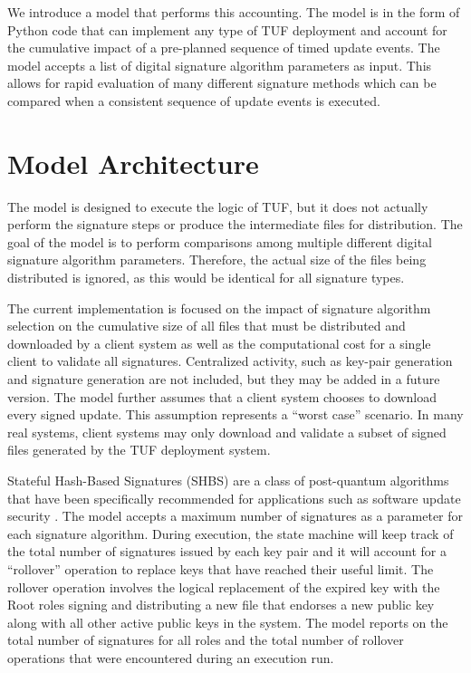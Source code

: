 \documentclass{article}
\begin{document}
We introduce a model that performs this accounting.  The model is in the form of Python code that can implement any type of TUF deployment and account for the cumulative impact of a pre-planned sequence of timed update events.  The model accepts a list of digital signature algorithm parameters as input.  This allows for rapid evaluation of many different signature methods which can be compared when a consistent sequence of update events is executed.  

\section{Model Architecture}
The model is designed to execute the logic of TUF, but it does not actually perform the signature steps or produce the intermediate files for distribution.  The goal of the model is to perform comparisons among multiple different digital signature algorithm parameters.  Therefore, the actual size of the files being distributed is ignored, as this would be identical for all signature types.

The current implementation is focused on the impact of signature algorithm selection on the cumulative size of all files that must be distributed and downloaded by a client system as well as the computational cost for a single client to validate all signatures.  Centralized activity, such as key-pair generation and signature generation are not included, but they may be added in a future version.  The model further assumes that a client system chooses to download every signed update.  This assumption represents a ``worst case'' scenario.  In many real systems, client systems may only download and validate a subset of signed files generated by the TUF deployment system.  

Stateful Hash-Based Signatures (SHBS) are a class of post-quantum algorithms that have been specifically recommended for applications such as software update security \cite{800-208}.  The model accepts a maximum number of signatures as a parameter for each signature algorithm.  During execution, the state machine will keep track of the total number of signatures issued by each key pair and it will account for a ``rollover'' operation to replace keys that have reached their useful limit.  The rollover operation involves the logical replacement of the expired key with the Root roles signing and distributing a new file that endorses a new public key along with all other active public keys in the system.  The model reports on the total number of signatures for all roles and the total number of rollover operations that were encountered during an execution run.  
\end{document}
